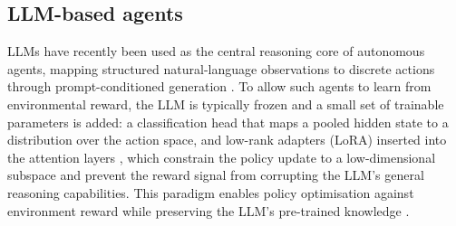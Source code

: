 \subsection*{LLM-based agents}
LLMs have recently been used as the central reasoning core of autonomous agents, mapping structured natural-language observations to discrete actions through prompt-conditioned generation \cite{xi2025rise}. To allow such agents to learn from environmental reward, the LLM is typically frozen and a small set of trainable parameters is added: a classification head that maps a pooled hidden state to a distribution over the action space, and low-rank adapters (LoRA) inserted into the attention layers \cite{hu2022lora}, which constrain the policy update to a low-dimensional subspace and prevent the reward signal from corrupting the LLM's general reasoning capabilities. This paradigm enables policy optimisation against environment reward while preserving the LLM's pre-trained knowledge \cite{qian2025toolrl}.
